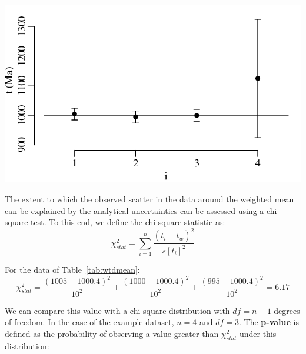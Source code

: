 \begin{refsection}
\noindent\begin{minipage}[t]{.5\textwidth}
\strut\vspace*{-\baselineskip}\newline
\includegraphics[width=\textwidth]{../figures/wtdmean.pdf}
\end{minipage}
\begin{minipage}[t]{.5\textwidth}
  \label{fig:wtdmean}
\end{minipage}

The extent to which the observed scatter in the data around the
weighted mean can be explained by the analytical uncertainties can be
assessed using a chi-square test.  To this end, we define the
chi-square statistic as:
\begin{equation}
  \chi^2_{stat} = \sum\limits_{i=1}^{n}\frac{(t_i-\bar{t}_w)^2}{s[t_i]^2}
  \label{eq:chi2wtdmean}
\end{equation}

For the data of Table~\ref{tab:wtdmean}:
\[
\chi^2_{stat} = \frac{(1005-1000.4)^2}{10^2}
+ \frac{(1000-1000.4)^2}{10^2}
+ \frac{(995-1000.4)^2}{10^2} = 6.17
\]
  
We can compare this value with a chi-square distribution with $df = n
- 1$ degrees of freedom. In the case of the example dataset, $n=4$ and
$df=3$. The \textbf{p-value} is defined as the probability of
observing a value greater than $\chi_{stat}^2$ under this
distribution:


\end{refsection}
